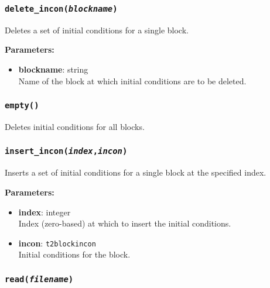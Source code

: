 \begin{snugshade}
\subsubsection{\texttt{delete\_incon(\emph{blockname})}}
\end{snugshade}
\label{sec:t2incon:delete_incon}

Deletes a set of initial conditions for a single block.

\textbf{Parameters:}
\begin{itemize}
\item \textbf{blockname}: string\\
  Name of the block at which initial conditions are to be deleted.
\end{itemize}

\begin{snugshade}
\subsubsection{\texttt{empty()}}
\end{snugshade}
\label{sec:t2incon:empty}

Deletes initial conditions for all blocks.

\begin{snugshade}
\subsubsection{\texttt{insert\_incon(\emph{index},\emph{incon})}}
\end{snugshade}
\label{sec:t2incon:insert_incon}

Inserts a set of initial conditions for a single block at the specified index.

\textbf{Parameters:}
\begin{itemize}
\item \textbf{index}: integer\\
  Index (zero-based) at which to insert the initial conditions.
\item \textbf{incon}: \texttt{t2blockincon}\\
  Initial conditions for the block.
\end{itemize}

\begin{snugshade}
\subsubsection{\texttt{read(\emph{filename})}}
\end{snugshade}
\label{sec:t2incon:read}

